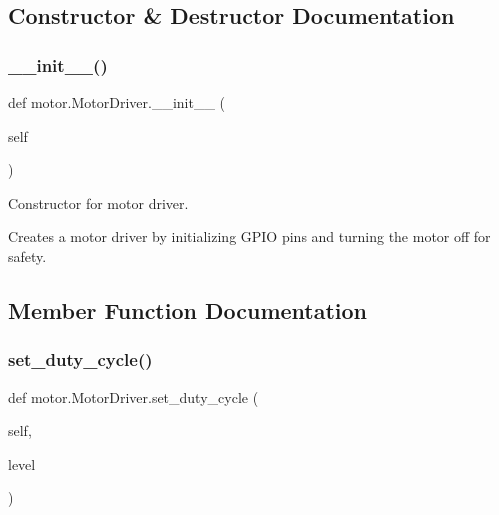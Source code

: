 \subsection{Constructor \& Destructor Documentation}
\mbox{\label{classmotor_1_1_motor_driver_a9e10ee95953b802b06ad4b9b3b6e35b9}} 
\subsubsection{\texorpdfstring{\+\_\+\+\_\+init\+\_\+\+\_\+()}{\_\_init\_\_()}}
{\footnotesize\ttfamily def motor.\+Motor\+Driver.\+\_\+\+\_\+init\+\_\+\+\_\+ (\begin{DoxyParamCaption}\item[{}]{self }\end{DoxyParamCaption})}



Constructor for motor driver. 

Creates a motor driver by initializing G\+P\+IO pins and turning the motor off for safety. 

\subsection{Member Function Documentation}
\mbox{\label{classmotor_1_1_motor_driver_a51b4721406aa66e0807413199b8b700f}} 
\subsubsection{\texorpdfstring{set\+\_\+duty\+\_\+cycle()}{set\_duty\_cycle()}}
{\footnotesize\ttfamily def motor.\+Motor\+Driver.\+set\+\_\+duty\+\_\+cycle (\begin{DoxyParamCaption}\item[{}]{self,  }\item[{}]{level }\end{DoxyParamCaption})}




